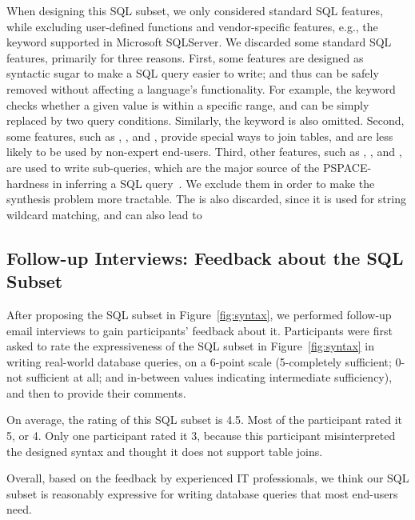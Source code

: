 When designing this SQL subset, we only considered standard
SQL features, while excluding user-defined functions and
vendor-specific features, e.g., the 
keyword supported in Microsoft SQLServer. 
We discarded some standard SQL features, primarily for
three reasons. First, some features are designed
as syntactic sugar to make a SQL query easier to write;
and thus can be safely removed without affecting a language's
functionality. For example, the 
keyword checks whether a given value is within a specific
range, and can be simply replaced by two query conditions.
Similarly, the  keyword is also omitted.
Second, some features, such as 
, , and ,
provide special ways to join tables, and are less likely to be
used by non-expert end-users.
Third, other features, such as , , and ,
are used to write sub-queries, which are the major source
of the PSPACE-hardness in inferring a SQL query~\cite{DasSarma:2010}.
We exclude them in order to make the synthesis problem more tractable.
The  is also discarded, since it is used for
string wildcard matching, and can also lead to 





\subsection{Follow-up Interviews: Feedback about the SQL Subset}
\label{sec:interview}

After proposing the SQL subset in Figure~\ref{fig:syntax},
we performed follow-up email interviews to gain
participants' feedback about it. Participants were first asked to rate
the expressiveness of the SQL subset in Figure~\ref{fig:syntax}
in writing real-world database queries,
on a 6-point scale (5-completely
sufficient; 0-not sufficient at all;
and in-between values indicating intermediate sufficiency),
and then to provide their comments.

On average, the rating of this SQL subset is 4.5. Most of
the participant rated it 5, or 4. Only one participant rated
it 3, because this participant misinterpreted the designed
syntax and thought it does not support table joins.

Overall, based on the feedback by experienced IT professionals,
we think our SQL subset is reasonably expressive
for writing database queries that most end-users need.

